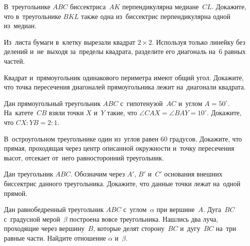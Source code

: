


\begin{problems}

\item
В~треугольнике $ABC$ биссектриса~$AK$ перпендикулярна медиане~$CL$.
Докажите, что в~треугольнике $BKL$ также одна из~биссектрис перпендикулярна
одной из~медиан.

\item
Из~листа бумаги в~клетку вырезали квадрат $2 \times 2$.
Используя только линейку без делений и~не~выходя за~пределы квадрата, разделите
его диагональ на~6 равных частей.

\item
Квадрат и~прямоугольник одинакового периметра имеют общий угол.
Докажите, что точка пересечения диагоналей прямоугольника лежит на~диагонали
квадрата.

\item
Дан прямоугольный треугольник $ABC$ с~гипотенузой~$AC$
и~углом $A = 50^{\circ}$.
На~катете~$CB$ взяли точки $X$ и~$Y$ такие, что
$\angle CAX = \angle BAY = 10^{\circ}$.
Докажите, что $CX : YB = 2 : 1$.

\item
В~остроугольном треугольнике один из~углов равен 60 градусов.
Докажите, что прямая, проходящая через центр описанной окружности и~точку
пересечения высот, отсекает от~него равносторонний треугольник.

\item
Дан треугольник $ABC$.
Обозначим через $A'$, $B'$ и~$C'$ основания внешних биссектрис данного
треугольника.
Докажите, что данные точки лежат на~одной прямой.

\item
Дан равнобедренный треугольник $ABC$ с~углом~$\alpha$ при вершине~$A$.
Дуга~$BC$ с~градусной мерой~$\beta$ построена вовсе треугольника.
Нашлись два луча, проходящие через вершину~$B$, которые делят сторону~$BC$
и~дугу~$BC$ на~три равные части.
Найдите отношение $\alpha$ и~$\beta$.

\end{problems}

